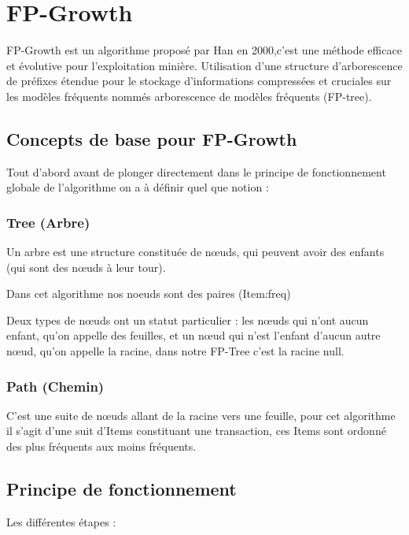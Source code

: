 \documentclass[12pt,a4paper,oneside]{book}
\begin{document}
\chapter{FP-Growth}

FP-Growth est un algorithme proposé par Han en 2000,c'est une méthode efficace et évolutive pour l'exploitation minière. 
Utilisation d'une structure d'arborescence de préfixes étendue pour le stockage d'informations compressées et cruciales sur les modèles fréquents nommés arborescence de modèles fréquents (FP-tree).

\section{Concepts de base pour FP-Growth}
Tout d'abord avant de plonger directement dans le principe de fonctionnement globale de l'algorithme on a à définir quel que notion :

\subsection*{Tree (Arbre)}
Un arbre est une structure constituée de nœuds, qui peuvent avoir des enfants (qui sont des nœuds à leur tour).

Dans cet algorithme nos noeuds sont des paires (Item:freq)

Deux types de nœuds ont un statut particulier : les nœuds qui n'ont aucun enfant, qu'on appelle des feuilles, et un nœud qui n'est l'enfant d'aucun autre nœud, qu'on appelle la racine, dans notre FP-Tree c'est la racine null.

\subsection*{Path (Chemin)}
C'est une suite de nœuds allant de la racine vers une feuille, pour cet algorithme il s'agit d'une suit d'Items constituant une transaction, ces Items sont ordonné des plus fréquents aux moins fréquents.

\newpage 
   
\section{Principe de fonctionnement}
Les différentes étapes :
\end{document}
